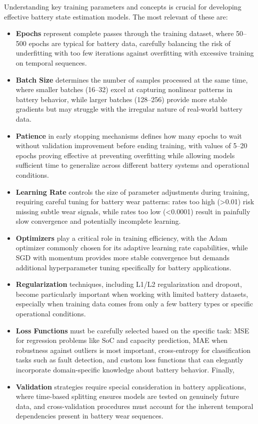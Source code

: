 Understanding key training parameters and concepts is crucial for developing effective battery state estimation models. The most relevant of these are:

\begin{itemize}
    \item \textbf{Epochs} represent complete passes through the training dataset, where 50--500 epochs are typical for battery data, carefully balancing the risk of underfitting with too few iterations against overfitting with excessive training on temporal sequences.
    \item \textbf{Batch Size} determines the number of samples processed at the same time, where smaller batches (16--32) excel at capturing nonlinear patterns in battery behavior, while larger batches (128--256) provide more stable gradients but may struggle with the irregular nature of real-world battery data.
    \item \textbf{Patience} in early stopping mechanisms defines how many epochs to wait without validation improvement before ending training, with values of 5--20 epochs proving effective at preventing overfitting while allowing models sufficient time to generalize across different battery systems and operational conditions.
    \item \textbf{Learning Rate} controls the size of parameter adjustments during training, requiring careful tuning for battery wear patterns: rates too high (>0.01) risk missing subtle wear signals, while rates too low (<0.0001) result in painfully slow convergence and potentially incomplete learning.
    \item \textbf{Optimizers} play a critical role in training efficiency, with the Adam optimizer commonly chosen for its adaptive learning rate capabilities, while SGD with momentum provides more stable convergence but demands additional hyperparameter tuning specifically for battery applications.
    \item \textbf{Regularization} techniques, including L1/L2 regularization and dropout, become particularly important when working with limited battery datasets, especially when training data comes from only a few battery types or specific operational conditions.
     \item \textbf{Loss Functions} must be carefully selected based on the specific task: MSE for regression problems like SoC and capacity prediction, MAE when robustness against outliers is most important, cross-entropy for classification tasks such as fault detection, and custom loss functions that can elegantly incorporate domain-specific knowledge about battery behavior. Finally,
    \item \textbf{Validation} strategies require special consideration in battery applications, where time-based splitting ensures models are tested on genuinely future data, and cross-validation procedures must account for the inherent temporal dependencies present in battery wear sequences.
\end{itemize}


